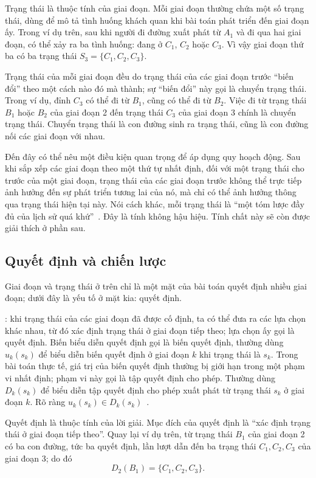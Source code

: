 \documentclass[11pt]{article}
\begin{document}
Trạng thái là thuộc tính của giai đoạn. Mỗi giai đoạn thường chứa một số
trạng thái, dùng để mô tả tình huống khách quan khi bài toán phát triển đến
giai đoạn ấy. Trong ví dụ trên, sau khi người đi đường xuất phát từ \(A_1\)
và đi qua hai giai đoạn, có thể xảy ra ba tình huống: đang ở \(C_1\), \(C_2\)
hoặc \(C_3\). Vì vậy giai đoạn thứ ba có ba trạng thái
\(S_3=\{C_1,C_2,C_3\}\).

Trạng thái của mỗi giai đoạn đều do trạng thái của các giai đoạn trước
``biến đổi'' theo một cách nào đó mà thành; sự ``biến đổi'' này gọi là
chuyển trạng thái. Trong ví dụ, đỉnh \(C_3\) có thể đi từ \(B_1\), cũng có
thể đi từ \(B_2\). Việc đi từ trạng thái \(B_1\) hoặc \(B_2\) của giai đoạn 2
đến trạng thái \(C_3\) của giai đoạn 3 chính là chuyển trạng thái. Chuyển
trạng thái là con đường sinh ra trạng thái, cũng là con đường nối các giai
đoạn với nhau.

Đến đây có thể nêu một điều kiện quan trọng để áp dụng quy hoạch động. Sau
khi sắp xếp các giai đoạn theo một thứ tự nhất định, đối với một trạng thái
cho trước của một giai đoạn, trạng thái của các giai đoạn trước không thể
trực tiếp ảnh hưởng đến sự phát triển tương lai của nó, mà chỉ có thể ảnh
hưởng thông qua trạng thái hiện tại này. Nói cách khác, mỗi trạng thái là
``một tóm lược đầy đủ của lịch sử quá khứ''~\cite{operations}. Đây là tính
không hậu hiệu. Tính chất này sẽ còn được giải thích ở phần sau.

\subsection{Quyết định và chiến lược}

Giai đoạn và trạng thái ở trên chỉ là một mặt của bài toán quyết định nhiều
giai đoạn; dưới đây là yếu tố ở mặt kia: quyết định.

: khi trạng thái của các giai đoạn đã được cố định, ta có
thể đưa ra các lựa chọn khác nhau, từ đó xác định trạng thái ở giai đoạn
tiếp theo; lựa chọn ấy gọi là quyết định. Biến biểu diễn quyết định gọi là
biến quyết định, thường dùng \(u_k(s_k)\) để biểu diễn biến quyết định ở giai
đoạn \(k\) khi trạng thái là \(s_k\). Trong bài toán thực tế, giá trị của
biến quyết định thường bị giới hạn trong một phạm vi nhất định; phạm vi này
gọi là tập quyết định cho phép. Thường dùng \(D_k(s_k)\) để biểu diễn tập
quyết định cho phép xuất phát từ trạng thái \(s_k\) ở giai đoạn \(k\). Rõ
ràng \(u_k(s_k)\in D_k(s_k)\)~\cite{operations}.

Quyết định là thuộc tính của lời giải. Mục đích của quyết định là ``xác định
trạng thái ở giai đoạn tiếp theo''. Quay lại ví dụ trên, từ trạng thái \(B_1\)
của giai đoạn 2 có ba con đường, tức ba quyết định, lần lượt dẫn đến ba trạng
thái \(C_1,C_2,C_3\) của giai đoạn 3; do đó
\[
  D_2(B_1)=\{C_1,C_2,C_3\}.
\]
\end{document}
